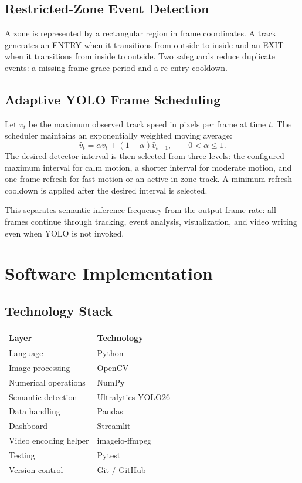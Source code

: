 \documentclass[12pt,a4paper]{report}
\begin{document}
\section{Restricted-Zone Event Detection}
A zone is represented by a rectangular region in frame coordinates. A track generates an ENTRY when it transitions from outside to inside and an EXIT when it transitions from inside to outside. Two safeguards reduce duplicate events: a missing-frame grace period and a re-entry cooldown.

\section{Adaptive YOLO Frame Scheduling}
Let $v_t$ be the maximum observed track speed in pixels per frame at time $t$. The scheduler maintains an exponentially weighted moving average:
\[
\hat{v}_t = \alpha v_t + (1-\alpha)\hat{v}_{t-1}, \qquad 0 < \alpha \le 1.
\]
The desired detector interval is then selected from three levels: the configured maximum interval for calm motion, a shorter interval for moderate motion, and one-frame refresh for fast motion or an active in-zone track. A minimum refresh cooldown is applied after the desired interval is selected.

This separates semantic inference frequency from the output frame rate: all frames continue through tracking, event analysis, visualization, and video writing even when YOLO is not invoked.

\chapter{Software Implementation}
\section{Technology Stack}
\begin{center}
\begin{tabular}{ll}
\toprule
Layer & Technology\\
\midrule
Language & Python\\
Image processing & OpenCV\\
Numerical operations & NumPy\\
Semantic detection & Ultralytics YOLO26\\
Data handling & Pandas\\
Dashboard & Streamlit\\
Video encoding helper & imageio-ffmpeg\\
Testing & Pytest\\
Version control & Git / GitHub\\
\bottomrule
\end{tabular}
\end{center}
\end{document}
